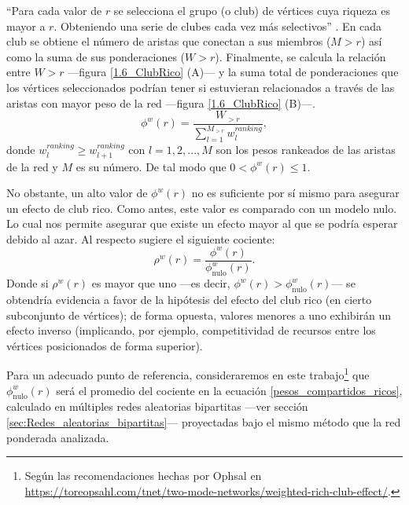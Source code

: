 \documentclass[letterpaper, 11pt]{book}
\theoremstyle{definition}
\theoremstyle{remark}
\begin{document}
``Para cada valor de $r$ se selecciona el grupo (o club) de vértices cuya riqueza es mayor a $r$. Obteniendo una serie de clubes cada vez más selectivos'' \citep[1]{2008_Ophsal_RichClub}. 
En cada club se obtiene el número de aristas que conectan a sus miembros ($M>r$) así como la suma de sus ponderaciones ($W>r$). 
Finalmente, se calcula la relación entre $W>r$ ---figura \ref{1.6_ClubRico} (A)--- y la suma total de ponderaciones que los vértices seleccionados podrían tener si estuvieran relacionados a través de las aristas con mayor peso de la red ---figura \ref{1.6_ClubRico} (B)---.
\begin{equation}\label{pesos_compartidos_ricos}
    \phi^{w}(r) = \frac{W_{> r}}{\sum_{l=1}^{M_{> r}} w_{l}^{ranking}},
\end{equation} 
donde $w_{l}^{ranking} \geq w_{l+1}^{ranking}$ con $l = 1,2,...,M$ son los pesos rankeados de las aristas de la red y $M$ es su número. 
De tal modo que $0 < \phi^{w}(r) \leq 1$. 



No obstante, un alto valor de $\phi^{w}(r)$ no es suficiente por sí mismo para asegurar un efecto de club rico. 
Como antes, este valor es comparado con un modelo nulo. 
Lo cual nos permite asegurar que existe un efecto mayor al que se podría esperar debido al azar. 
Al respecto \citet{2008_Ophsal_RichClub} sugiere el siguiente cociente: 
\begin{equation}\label{eq:club_rico}
    \rho^{w}(r) = \frac{\phi^{w}(r)}{\phi^{w}_{\text{nulo}}(r)}.
\end{equation} 
Donde si $\rho^{w}(r)$ es mayor que uno ---es decir, $\phi^{w}(r) > \phi^{w}_{\text{nulo}}(r)$--- se obtendría evidencia a favor de la hipótesis del efecto del club rico (en cierto subconjunto de vértices); de forma opuesta, valores menores a uno exhibirán un efecto inverso (implicando, por ejemplo, competitividad de recursos entre los vértices posicionados de forma superior). 


Para un adecuado punto de referencia, consideraremos en este trabajo\footnote{
    Según las recomendaciones hechas por Ophsal en \url{https://toreopsahl.com/tnet/two-mode-networks/weighted-rich-club-effect/}.
} que $\phi^{w}_{\text{nulo}}(r)$ será el promedio del cociente en la ecuación \ref{pesos_compartidos_ricos}, calculado en múltiples redes aleatorias bipartitas ---ver sección \ref{sec:Redes_aleatorias_bipartitas}--- proyectadas bajo el mismo método que la red ponderada analizada. 
\end{document}
